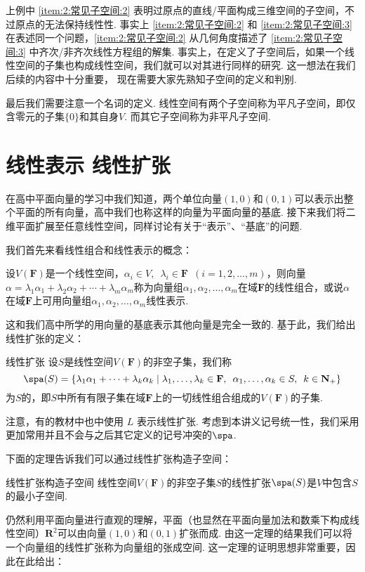 上例中 \ref*{item:2:常见子空间:2} 表明过原点的直线/平面构成三维空间的子空间，不过原点的无法保持线性性. 事实上 \ref*{item:2:常见子空间:2} 和 \ref*{item:2:常见子空间:3} 在表述同一个问题，\ref*{item:2:常见子空间:2} 从几何角度描述了 \ref*{item:2:常见子空间:3} 中齐次/非齐次线性方程组的解集. 事实上，在定义了子空间后，如果一个线性空间的子集也构成线性空间，我们就可以对其进行同样的研究. 这一想法在我们后续的内容中十分重要， 现在需要大家先熟知子空间的定义和判别.

最后我们需要注意一个名词的定义. 线性空间有两个子空间称为平凡子空间，即仅含零元的子集$\{0\}$和其自身$V$. 而其它子空间称为非平凡子空间.

\section{线性表示 \quad 线性扩张}

在高中平面向量的学习中我们知道，两个单位向量$(1,0)$和$(0,1)$可以表示出整个平面的所有向量，高中我们也称这样的向量为平面向量的基底. 接下来我们将二维平面扩展至任意线性空间，同样讨论有关于``表示''、``基底''的问题.

我们首先来看线性组合和线性表示的概念：
\begin{definition}{}{}
    设$V(\mathbf{F})$是一个线性空间，$\alpha_i\in V,\enspace\lambda_i\in \mathbf{F}\enspace(i=1,2,\ldots,m)$，则向量$\alpha=\lambda_1\alpha_1+\lambda_2\alpha_2+\cdots+\lambda_m\alpha_m$称为向量组$\alpha_1,\alpha_2,\ldots,\alpha_m$在域$\mathbf{F}$的线性组合，或说$\alpha$在域$\mathbf{F}$上可用向量组$\alpha_1,\alpha_2,\ldots,\alpha_m$线性表示.
\end{definition}
这和我们高中所学的用向量的基底表示其他向量是完全一致的. 基于此，我们给出线性扩张的定义：
\begin{definition}{线性扩张}{} 
    设$S$是线性空间$V(\mathbf{F})$的非空子集，我们称
    \[ \spa(S)=\{\lambda_1\alpha_1+\cdots+\lambda_k\alpha_k \mid \lambda_1,\ldots,\lambda_k\in\mathbf{F},\enspace\alpha_1,\ldots,\alpha_k\in S,\enspace k\in\mathbf{N}_+\} \]
    为$S$的，即$S$中所有有限子集在域$\mathbf{F}$上的一切线性组合组成的$V(\mathbf{F})$的子集.
\end{definition}
注意，有的教材中也中使用 $L$ 表示线性扩张. 考虑到本讲义记号统一性，我们采用更加常用并且不会与之后其它定义的记号冲突的$\spa$.

下面的定理告诉我们可以通过线性扩张构造子空间：
\begin{theorem}{}{线性扩张构造子空间}
    线性空间$V(\mathbf{F})$的非空子集$S$的线性扩张$\spa(S)$是$V$中包含$S$的最小子空间.
\end{theorem}
仍然利用平面向量进行直观的理解，平面（也显然在平面向量加法和数乘下构成线性空间）$\mathbf{R}^2$可以由向量$(1,0)$和$(0,1)$扩张而成. 由这一定理的结果我们可以将一个向量组的线性扩张称为向量组的张成空间. 这一定理的证明思想非常重要，因此在此给出：

